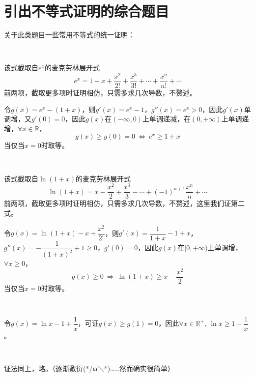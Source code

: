 \section{引出不等式证明的综合题目}
关于此类题目一些常用不等式的统一证明：\vspace{0.5em}
\begin{thm}
\end{thm}
\ \begin{kaiti}该式截取自$e^x$的麦克劳林展开式$$e^x=1+x+\dfrac{x^2}{2!}+\dfrac{x^3}{3!}+\cdots+\dfrac{x^n}{n!}+\cdots$$前两项，截取更多项时证明相仿，只需多求几次导数，不赘述。\par
	令$g(x)=e^x-(1+x)$，则$g'(x)=e^x-1$，$g''(x)=e^x>0$，因此$g'(x)$单调增，又$g'(0)=0$，因此$g(x)$在$(-\infty,0)$上单调递减，在$(0,+\infty)$上单调递增，$\forall x\in\mathbb{R}$，$$g(x)\geqslant g(0)=0\ \Leftrightarrow\ e^x\geqslant 1+x$$
	当仅当$x=0$时取等。\end{kaiti}
\begin{thm}
\end{thm}
\ \begin{kaiti}该式截取自$\ln(1+x)$的麦克劳林展开式$$\ln(1+x)=x-\dfrac{x^2}{2}+\dfrac{x^3}{3}-\cdots+(-1)^{n+1}\dfrac{x^n}{n}+\cdots$$前两项，截取更多项时证明相仿，只需多求几次导数，不赘述，这里我们证第二式。\par
	令$g(x)=\ln(1+x)-x+\dfrac{x^2}{2!}$，则$g'(x)=\dfrac{1}{1+x}-1+x$，$g''(x)=-\dfrac{1}{(1+x)^2}+1\geqslant 0$，$g'(0)=0$，因此$g(x)$在$[0,+\infty)$上单调增，$\forall x\geqslant 0$，$$g(x)\geqslant 0 \ \Rightarrow\ \ln(1+x)\geqslant x-\dfrac{x^2}{2}$$
	当仅当$x=0$时取等。\end{kaiti}
\begin{thm}
\end{thm}
\ \begin{kaiti}令$g(x)=\ln x-1+\dfrac{1}{x}$，可证$g(x)\geqslant g(1)=0$，因此$\forall x\in \mathbb{R}^+,\ \ln x\geqslant 1-\dfrac{1}{x}$。\end{kaiti}
\begin{thm}
	\par
\end{thm}
\ \begin{kaiti}证法同上，略。（逐渐敷衍(*/ω＼*)……然而确实很简单）\end{kaiti}\vspace{1em}

